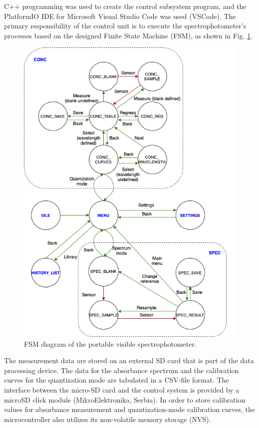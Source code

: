 \documentclass[conference]{IEEEtran}
\begin{document}
C++ programming was used to create the control subsystem program, and the PlatformIO IDE for Microsoft Visual Studio Code was used (VSCode).
The primary responsibility of the control unit is to execute the spectrophotometer's processes based on the designed Finite State Machine (FSM), as shown in Fig. \ref{fsm}.

    \begin{figure}[htbp]
    \centerline{\includegraphics[scale=0.35]{fsm.png}}
    \caption{FSM diagram of the portable visible spectrophotometer.}
    \label{fsm}
    \end{figure}

The measurement data are stored on an external SD card that is part of the data processing device.
The data for the absorbance spectrum and the calibration curves for the quantization mode are tabulated in a CSV-file format.
The interface between the micro-SD card and the control system is provided by a microSD click module (MikroElektronika, Serbia).
In order to store calibration values for absorbance measurement and quantization-mode calibration curves, the microcontroller also utilizes its non-volatile memory storage (NVS).
\end{document}
